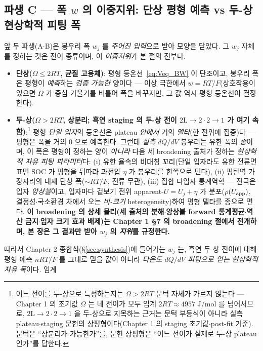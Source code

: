 \subsection{파생 C --- 폭 $w$ 의 이중지위: 단상 평형 예측 vs 두-상 현상학적 피팅 폭}\label{ssec:weff}
앞 두 파생(A$\cdot$B)은 봉우리 폭 $w_j$ 를 \emph{주어진 입력}으로 받아 모양을 닫았다. 그 $w_j$ 자체를 정하는
것은 전이 종류이며, 이 \emph{이중지위}가 본 절의 전부다.
\begin{itemize}[leftmargin=1.4em,itemsep=2pt]
\item \textbf{단상($\Omega\le2RT$, 균질 고용체)}: 평형 등온선~\eqref{eq:Veq_BW} 이 단조이고, 봉우리 폭은 평형이
\emph{예측}하는 \emph{검증 가능한} 양이다 --- 이상 극한에서 $w=RT/F$(상호작용이 있으면 $\Omega$ 가 중심
기울기를 비틀어 폭을 바꾸지만, 그 값 역시 평형 등온선이 결정한다).
\item \textbf{두-상($\Omega>2RT$, 상분리; 흑연 staging 의 두-상 전이 $2\mathrm L\!\to\!2\cdot2\!\to\!1$ 가 여기
속함)}:\footnote{어느 전이를 두-상으로 특정하는지는 $\Omega>2RT$ 문턱 자체가 가르지 않는다 --- Chapter 1 의
초기값 $\Omega$ 는 네 전이가 모두 임계 $2RT\approx4957$ J/mol 를 넘어서므로, $2\mathrm L\!\to\!2\cdot2\!\to\!1$
을 두-상으로 지목하는 근거는 문턱 부등식이 아니라 실측 plateau$\cdot$staging 문헌의 상평형이다(Chapter 1 의
staging 초기값$\cdot$post-fit 기준). 문턱은 ``상분리가 가능한가''를, 문헌 상평형은 ``어느 전이가 실제로 두-상
plateau 인가''를 답한다.} 평형 \emph{단일 입자}의 등온선은 plateau \emph{안에서} 거의 \emph{델타}(한 전위에 집중)다 --- 평형은
폭을 거의 $0$ 으로 예측한다. 그런데 \emph{실측} $dQ/dV$ 봉우리는 유한 폭의 \emph{종}이며, 이 폭은 평형이 정하는
양이 \emph{아니라} 다음 세 broadening 출처가 정하는 \emph{현상학적 자유 피팅 파라미터}다: (i) 유한 율속의
비대칭 꼬리(단일 입자라도 유한 전류면 표면 SOC 가 평형을 뒤따라 과전압 $\eta$ 가 봉우리를 한쪽으로 민다),
(ii) 평탄역 가장자리의 내재 단상 폭($\sim RT/F$, 전류 무관), (iii) 집합 다입자 통계역학 --- 전극은 입자
\emph{앙상블}이고, 입자마다 겉보기 전위 apparent-$U=U_j+\eta$ 가 분포($\rho(U_{\mathrm{app}})$, 결정성$\cdot$국소환경
차에서 오는 \emph{비-크기} heterogeneity)하여 평형 델타를 종으로 편다. \textbf{이 broadening 의 상세 물리(세
출처의 분해$\cdot$앙상블 forward 통계평균$\cdot$역산 금지$\cdot$입자 크기 효과 배제)는 Chapter 1 §7 의
broadening 절에서 전개하며, 본 장은 그 결과만 받아 $w_j$ 의 \emph{지위}를 규정한다.}
\end{itemize}
따라서 Chapter 2 종합식(\S\ref{sec:synthesis})에 들어가는 $w_j$ 는, 흑연 두-상 전이에 대해 평형 예측
$nRT/F$ 를 그대로 믿을 값이 아니라 \emph{다온도 $dQ/dV$ 피팅으로 얻는 현상학적 자유 폭}이다. 임계
